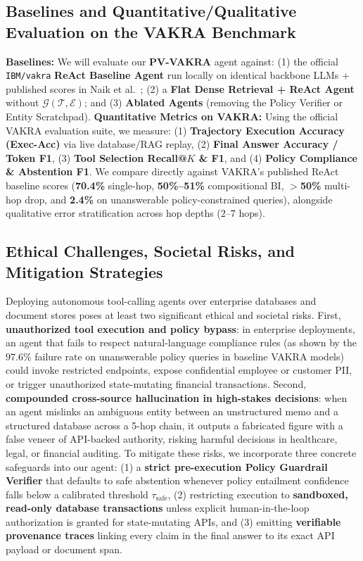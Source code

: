 \documentclass[10pt]{article}
\begin{document}
\subsection{Baselines and Quantitative/Qualitative Evaluation on the VAKRA Benchmark}
\textbf{Baselines:} We will evaluate our \textbf{PV-VAKRA} agent against: (1) the official \texttt{IBM/vakra} \textbf{ReAct Baseline Agent} run locally on identical backbone LLMs + published scores in Naik et al.\ \cite{naik2026vakra}; (2) a \textbf{Flat Dense Retrieval + ReAct Agent} without $\mathcal{G}(\mathcal{T}, \mathcal{E})$; and (3) \textbf{Ablated Agents} (removing the Policy Verifier or Entity Scratchpad).
\textbf{Quantitative Metrics on VAKRA:} Using the official VAKRA evaluation suite, we measure: (1) \textbf{Trajectory Execution Accuracy (Exec-Acc)} via live database/RAG replay, (2) \textbf{Final Answer Accuracy / Token F1}, (3) \textbf{Tool Selection Recall@$K$ \& F1}, and (4) \textbf{Policy Compliance \& Abstention F1}. We compare directly against VAKRA's published ReAct baseline scores (\textbf{70.4\%} single-hop, \textbf{50\%--51\%} compositional BI, \textbf{$>$50\%} multi-hop drop, and \textbf{2.4\%} on unanswerable policy-constrained queries), alongside qualitative error stratification across hop depths ($2\text{--}7$ hops).

\subsection{Ethical Challenges, Societal Risks, and Mitigation Strategies}
Deploying autonomous tool-calling agents over enterprise databases and document stores poses at least two significant ethical and societal risks. First, \textbf{unauthorized tool execution and policy bypass}: in enterprise deployments, an agent that fails to respect natural-language compliance rules (as shown by the $97.6\%$ failure rate on unanswerable policy queries in baseline VAKRA models) could invoke restricted endpoints, expose confidential employee or customer PII, or trigger unauthorized state-mutating financial transactions. Second, \textbf{compounded cross-source hallucination in high-stakes decisions}: when an agent mislinks an ambiguous entity between an unstructured memo and a structured database across a 5-hop chain, it outputs a fabricated figure with a false veneer of API-backed authority, risking harmful decisions in healthcare, legal, or financial auditing. To mitigate these risks, we incorporate three concrete safeguards into our agent: (1) a \textbf{strict pre-execution Policy Guardrail Verifier} that defaults to safe abstention whenever policy entailment confidence falls below a calibrated threshold $\tau_{\text{safe}}$, (2) restricting execution to \textbf{sandboxed, read-only database transactions} unless explicit human-in-the-loop authorization is granted for state-mutating APIs, and (3) emitting \textbf{verifiable provenance traces} linking every claim in the final answer to its exact API payload or document span.

{\footnotesize


}
\end{document}

